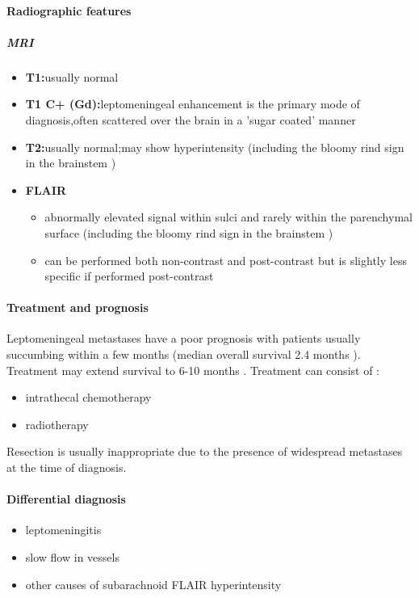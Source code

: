 \paragraph{Radiographic features}

\subparagraph{MRI}

\begin{itemize}
	\item
	\textbf{T1:}usually normal
	\item
	\textbf{T1 C+ (Gd):}leptomeningeal enhancement is the primary mode of diagnosis,often scattered over the brain in a 'sugar coated' manner
	\item
	\textbf{T2:}usually normal;may show hyperintensity (including the bloomy rind sign in the brainstem )
	\item
	\textbf{FLAIR}
	
	\begin{itemize}
		\item
		abnormally elevated signal within sulci  and rarely within the parenchymal surface (including the bloomy rind sign in the brainstem )
		\item
		can be performed both non-contrast and post-contrast but is slightly less specific if performed post-contrast 
	\end{itemize}
\end{itemize}

\paragraph{Treatment and prognosis}

Leptomeningeal metastases have a poor prognosis with patients usually succumbing within a few months (median overall survival 2.4 months ). Treatment may extend survival to 6-10 months . Treatment can consist of :

\begin{itemize}
	\item
	intrathecal chemotherapy
	\item
	radiotherapy
\end{itemize}

Resection is usually inappropriate due to the presence of widespread metastases at the time of diagnosis.

\paragraph{Differential diagnosis}

\begin{itemize}
	\item
	leptomeningitis
	\item
	slow flow in vessels
	\item
	other causes of subarachnoid FLAIR hyperintensity
\end{itemize}
